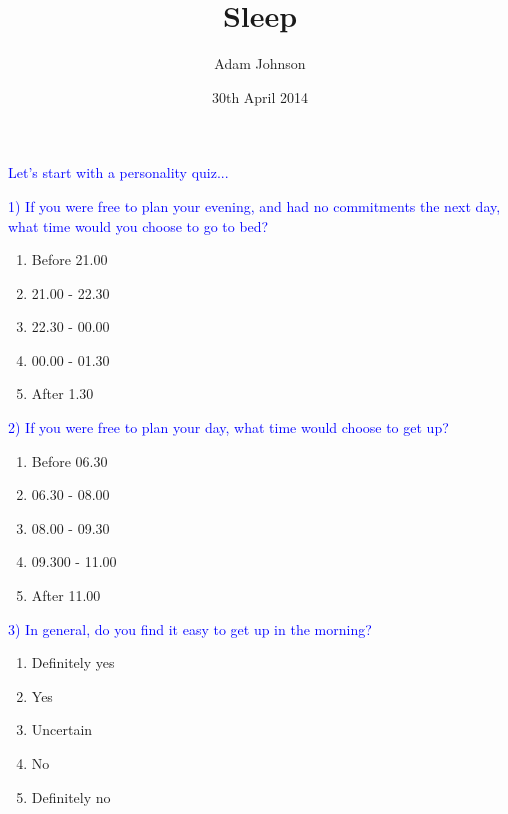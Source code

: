 \documentclass[landscape]{slides}
\title{Sleep}
\author{Adam Johnson}
\date{30th April 2014}
\begin{document}
\maketitle


\begin{slide}

    \textcolor{blue}{\Large{Let's start with a personality quiz...}}

\end{slide}


\begin{slide}

    \textcolor{blue}{\Large{1) If you were free to plan your evening, and had no commitments the next day, what time would you choose to go to bed?}}

    \begin{enumerate}
        \item Before 21.00
        \item 21.00 - 22.30
        \item 22.30 - 00.00
        \item 00.00 - 01.30
        \item After 1.30
    \end{enumerate}

\end{slide}


\begin{slide}

    \textcolor{blue}{\Large{2) If you were free to plan your day, what time would choose to get up?}}

    \begin{enumerate}
        \item Before 06.30
        \item 06.30 - 08.00
        \item 08.00 - 09.30
        \item 09.300 - 11.00
        \item After 11.00
    \end{enumerate}

\end{slide}



\begin{slide}

    \textcolor{blue}{\Large{3) In general, do you find it easy to get up in the morning?}}

    \begin{enumerate}
        \item Definitely yes
        \item Yes
        \item Uncertain
        \item No
        \item Definitely no
    \end{enumerate}

\end{slide}
\end{document}
